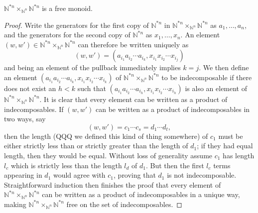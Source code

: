 \documentclass{amsbook} %
\numberwithin{section}{chapter}
\begin{document}
\begin{lem}\label{freemon} $\mathbb{N}^{\ast n} \times_{\mathbb{N}^n} \mathbb{N}^{\ast n}$ is a free monoid.
\end{lem}
\begin{proof}
Write the generators for the first copy of $\mathbb{N}^{\ast n}$ in $\mathbb{N}^{\ast n} \times_{\mathbb{N}^n} \mathbb{N}^{\ast n}$ as $a_1, \ldots, a_n$, and the generators for the second copy of $\mathbb{N}^{\ast n}$ as $x_1, \ldots, x_n$. An element $(w,w') \in \mathbb{N}^{\ast n} \times_{\mathbb{N}^n} \mathbb{N}^{\ast n}$ can therefore be written uniquely as
\[
(w,w') = (a_{i_1} a_{i_2} \cdots a_{i_k}, x_{i_1} x_{i_2} \cdots x_{i_j})
\]
and being an element of the pullback immediately implies $k=j$. We then define an element $ (a_{i_1} a_{i_2} \cdots a_{i_k}, x_{i_1} x_{i_2} \cdots x_{i_k})$ of $\mathbb{N}^{\ast n} \times_{\mathbb{N}^n} \mathbb{N}^{\ast n}$ to be indecomposable if there does not exist an $h < k$ such that $ (a_{i_1} a_{i_2} \cdots a_{i_h}, x_{i_1} x_{i_2} \cdots x_{i_h})$ is also an element of $\mathbb{N}^{\ast n} \times_{\mathbb{N}^n} \mathbb{N}^{\ast n}$. It is clear that every element can be written as a product of indecomposables. If $(w,w')$ can be written as a product of indecomposables in two ways, say 
\[
(w,w') = c_1 \cdots c_s = d_1 \cdots d_t,
\]
then the length (QQQ we defined this kind of thing somewhere) of $c_1$ must be either strictly less than or strictly greater than the length of $d_1$; if they had equal length, then they would be equal. Without loss of generality assume $c_1$ has length $l_c$ which is strictly less than the length $l_d$ of $d_1$. But then the first $l_c$ terms appearing in $d_1$ would agree with $c_1$, proving that $d_1$ is not indecomposable. Straightforward induction then finishes the proof that every element of $\mathbb{N}^{\ast n} \times_{\mathbb{N}^n} \mathbb{N}^{\ast n}$ can be written as a product of indecomposables in a unique way, making $\mathbb{N}^{\ast n} \times_{\mathbb{N}^n} \mathbb{N}^{\ast n}$ free on the set of indecomposables.


\end{proof}
\end{document}
